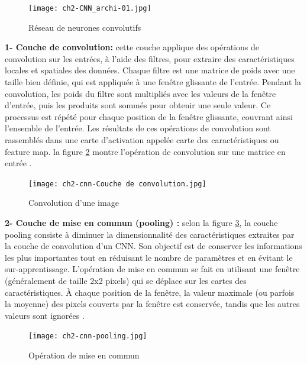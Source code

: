 \begin{figure}[H]
	\centering
	\texttt{[image: ch2-CNN\_archi-01.jpg]}
	\caption{Réseau de neurones convolutifs}
\label{fig:CNN}
\end{figure}

\textbf{1- Couche de convolution:} cette couche applique des opérations de convolution sur les entrées, à l'aide des filtres, pour extraire des caractéristiques locales et spatiales des données. Chaque filtre est une matrice de poids avec une taille bien définie, qui est appliquée à une fenêtre glissante de l'entrée. Pendant la convolution, les poids du filtre sont multipliés avec les valeurs de la fenêtre d'entrée, puis les produits sont sommés pour obtenir une seule valeur. Ce processus est répété pour chaque position de la fenêtre glissante, couvrant ainsi l'ensemble de l'entrée. Les résultats de ces opérations de convolution sont rassemblés dans une carte d'activation appelée carte des caractéristiques ou feature map.
la figure \ref{fig:convolution} montre l'opération de convolution sur une matrice en entrée \cite{cnn_Agronomy86}.

\begin{figure}[H]
	\centering
	\texttt{[image: ch2-cnn-Couche de convolution.jpg]}
	\caption{Convolution d'une image}
 \label{fig:convolution}
\end{figure}

\textbf{2- Couche de mise en commun (pooling) :} selon la figure \ref{fig:pooling}, la couche pooling consiste à diminuer la dimensionnalité des caractéristiques extraites par la couche de convolution d'un CNN. Son objectif est de conserver les informations les plus importantes tout en réduisant le nombre de paramètres et en évitant le sur-apprentissage. L'opération de mise en commun se fait en utilisant une fenêtre (généralement de taille 2x2 pixels) qui se déplace sur les cartes des caractéristiques. À chaque position de la fenêtre, la valeur maximale (ou parfois la moyenne) des pixels couverts par la fenêtre est conservée, tandis que les autres valeurs sont ignorées \cite{makina-corpus}.

\begin{figure}[H]
	\centering
	\texttt{[image: ch2-cnn-pooling.jpg]}
	\caption{Opération de mise en commun}
 \label{fig:pooling}
\end{figure}

